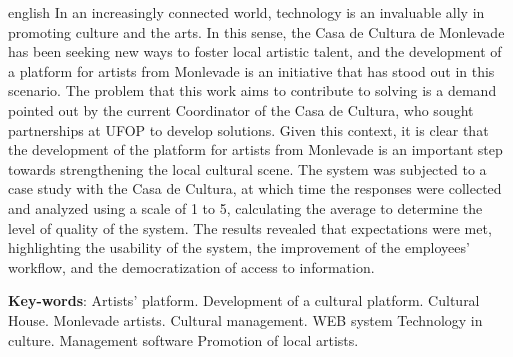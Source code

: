 \begin{resumo}[Abstract]
 \begin{otherlanguage*}{english}
  In an increasingly connected world, technology is an invaluable ally in promoting culture and the arts. In this sense, the Casa de Cultura de Monlevade has been seeking new ways to foster local artistic talent, and the development of a platform for artists from Monlevade is an initiative that has stood out in this scenario. The problem that this work aims to contribute to solving is a demand pointed out by the current Coordinator of the Casa de Cultura, who sought partnerships at UFOP to develop solutions. Given this context, it is clear that the development of the platform for artists from Monlevade is an important step towards strengthening the local cultural scene. The system was subjected to a case study with the Casa de Cultura, at which time the responses were collected and analyzed using a scale of 1 to 5, calculating the average to determine the level of quality of the system. The results revealed that expectations were met, highlighting the usability of the system, the improvement of the employees' workflow, and the democratization of access to information.

   \vspace{\onelineskip}

   \noindent
   \textbf{Key-words}: 
   Artists' platform.
   Development of a cultural platform.
   Cultural House.
   Monlevade artists.
   Cultural management.
   WEB system
   Technology in culture.
   Management software
   Promotion of local artists.
 \end{otherlanguage*}
\end{resumo}